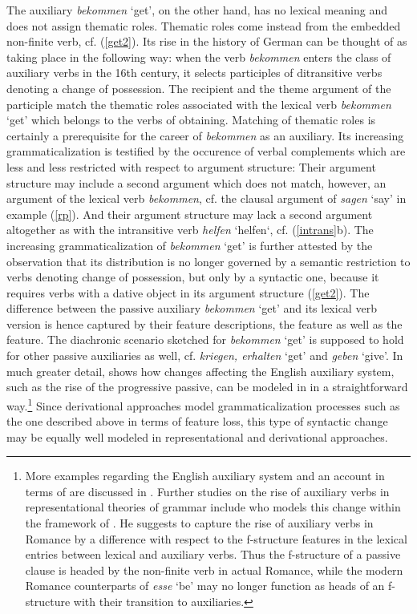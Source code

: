 \documentclass[output=paper
                ,modfonts
                ,nonflat
	        ,collection
	        ,collectionchapter
	        ,collectiontoclongg
 	        ,biblatex
                ,babelshorthands
                ,newtxmath
                ,draftmode
                ,colorlinks, citecolor=brown
]{./langsci/langscibook}
\begin{document}
The auxiliary \textit{bekommen} `get', on the other hand, has no lexical meaning and does not assign thematic roles. Thematic roles come instead from the embedded non-finite verb, cf. (\ref{get2}). Its rise in the history of German can be thought of as taking place in the following way: when the verb \textit{bekommen} enters the class of auxiliary verbs in the 16th century, it selects participles of ditransitive verbs denoting a change of possession. The recipient and the theme argument of the participle match the thematic roles associated with the lexical verb \textit{bekommen} `get' which belongs to the verbs of obtaining. Matching of thematic roles is certainly a prerequisite for the career of \textit{bekommen} as an auxiliary. Its increasing grammaticalization is testified by the occurence of verbal complements which are less and less restricted with respect to argument structure: Their argument structure may include a second argument which does not match, however, an argument of the lexical verb \textit{bekommen}, cf. the clausal argument of \textit{sagen} `say' in example (\ref{rp}). And their argument structure may lack a second argument altogether as with the intransitive verb \textit{helfen} `helfen`, cf. (\ref{intrans}b). The increasing grammaticalization of \textit{bekommen} `get' is further attested by the observation that its distribution is no longer governed by a semantic restriction to verbs denoting change of possession, but only by a syntactic one, because it requires verbs with a dative object in its argument structure (\ref{get2}). The difference between the passive auxiliary \textit{bekommen} `get' and its lexical verb version is hence captured by their feature descriptions, \ie the \cat feature as well as the \content feature. The diachronic scenario sketched for \textit{bekommen} `get' is supposed to hold for other passive auxiliaries as well, cf. \textit{kriegen, erhalten} `get' and \textit{geben} `give'. In much greater detail, \cite{warner1995} shows how changes affecting the English auxiliary system, such as the rise of the progressive passive, can be modeled in \hpsg in a straightforward way.\footnote{More examples regarding the English auxiliary system and an account in terms of \hpsg are discussed in \cite{warner1993}. Further studies on the rise of auxiliary verbs in representational theories of grammar include \cite{schwarze2001} who models this change within the framework of \lfg. He suggests to capture the rise of auxiliary verbs in Romance by a difference with respect to the f-structure features in the lexical entries between lexical and auxiliary verbs. Thus the f-structure of a passive clause is headed by the non-finite verb in actual Romance, while the modern Romance counterparts of  \textit{esse} `be' may no longer function as heads of an f-structure with their transition to auxiliaries.} Since derivational approaches model grammaticalization processes such as the one described above in terms of feature loss, this type of syntactic change may be equally well modeled in representational and derivational approaches.
\end{document}
